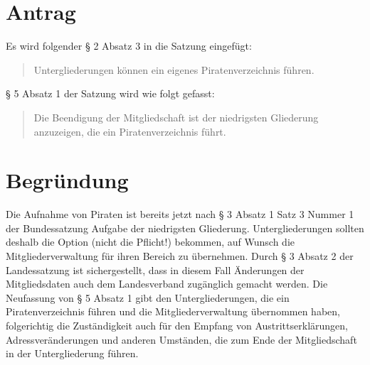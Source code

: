 \section{Antrag}

Es wird folgender § 2 Absatz 3 in die Satzung eingefügt:

\begin{quote}
Untergliederungen können ein eigenes Piratenverzeichnis führen.

\end{quote}
§ 5 Absatz 1 der Satzung wird wie folgt gefasst:

\begin{quote}
Die Beendigung der Mitgliedschaft ist der niedrigsten Gliederung anzuzeigen, die ein Piratenverzeichnis führt.

\end{quote}
\section{Begründung}

Die Aufnahme von Piraten ist bereits jetzt nach § 3 Absatz 1 Satz 3 Nummer 1 der Bundessatzung Aufgabe der niedrigsten Gliederung. Untergliederungen sollten deshalb die Option (nicht die Pflicht!) bekommen, auf Wunsch die Mitgliederverwaltung für ihren Bereich zu übernehmen. Durch § 3 Absatz 2 der Landessatzung ist sichergestellt, dass in diesem Fall Änderungen der Mitgliedsdaten auch dem Landesverband zugänglich gemacht werden. Die Neufassung von § 5 Absatz 1 gibt den Untergliederungen, die ein Piratenverzeichnis führen und die Mitgliederverwaltung übernommen haben, folgerichtig die Zuständigkeit auch für den Empfang von Austrittserklärungen, Adressveränderungen und anderen Umständen, die zum Ende der Mitgliedschaft in der Untergliederung führen.
